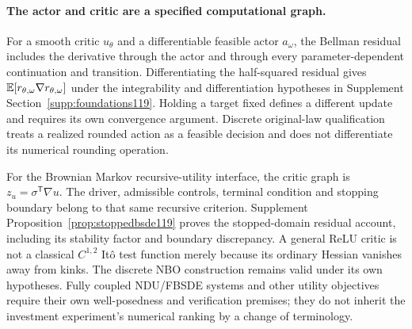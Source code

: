 \paragraph{The actor and critic are a specified computational graph.}
For a smooth critic $u_\theta$ and a differentiable feasible actor $a_\omega$,
the Bellman residual includes the derivative through the actor and through
every parameter-dependent continuation and transition. Differentiating the
half-squared residual gives $\mathbb E[r_{\theta,\omega}\nabla r_{\theta,\omega}]$
under the integrability and differentiation hypotheses in Supplement
Section~\ref{supp:foundations119}. Holding a target fixed defines a different
update and requires its own convergence argument. Discrete original-law
qualification treats a realized rounded action as a feasible decision and
does not differentiate its numerical rounding operation.

For the Brownian Markov recursive-utility interface, the critic graph is
$z_u=\sigma^{\mathsf T}\nabla u$. The driver, admissible controls, terminal
condition and stopping boundary belong to that same recursive criterion.
Supplement Proposition~\ref{prop:stoppedbsde119} proves the stopped-domain
residual account, including its stability factor and boundary discrepancy.
A general ReLU critic is not a classical $C^{1,2}$ It\^o test function merely
because its ordinary Hessian vanishes away from kinks. The discrete NBO
construction remains valid under its own hypotheses. Fully coupled NDU/FBSDE
systems and other utility objectives require their own well-posedness and
verification premises; they do not inherit the investment experiment's
numerical ranking by a change of terminology.
